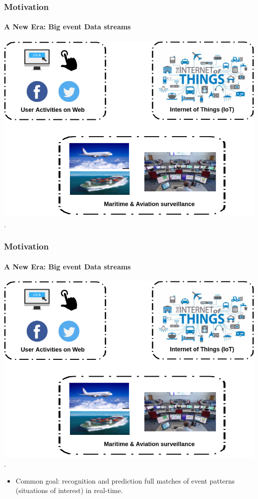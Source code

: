 



\frame
{
	\frametitle{Motivation}
	\framesubtitle{A New Era: Big event Data streams}
		\begin{center}
		\includegraphics[scale=.36]{figures/motiv.png}\\
		.
	\end{center}
}


\frame
{
\frametitle{Motivation}
\framesubtitle{A New Era: Big event Data streams}
\begin{center}
	\includegraphics[scale=.27]{figures/motiv.png}\\
	.
\end{center}
	

	\begin{itemize}[]
		
		\item<1-> Common goal: recognition and prediction full matches of event patterns (situations of interest) in real-time.
		
	\end{itemize}
}


